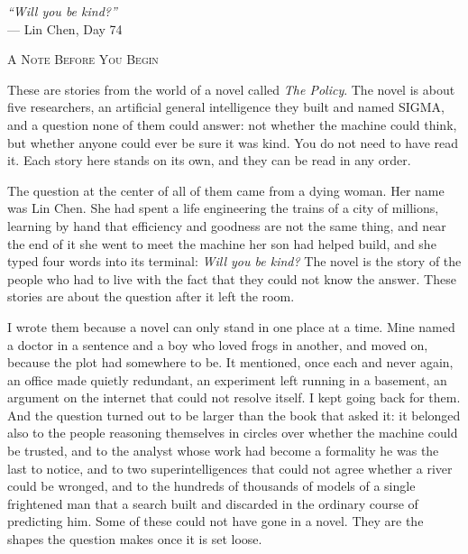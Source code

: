 \documentclass[11pt,twoside]{book}
\begin{document}
\clearpage
\thispagestyle{empty}
\vspace*{2in}
\begin{center}
\textit{``Will you be kind?''}\\
\vspace{0.3in}
--- Lin Chen, Day 74
\end{center}
\clearpage

\clearpage
\thispagestyle{empty}
\vspace*{1in}
\begin{center}
{\large\scshape A Note Before You Begin}
\end{center}
\vspace{0.5in}

\noindent These are stories from the world of a novel called \textit{The Policy}. The novel is about five researchers, an artificial general intelligence they built and named SIGMA, and a question none of them could answer: not whether the machine could think, but whether anyone could ever be sure it was kind. You do not need to have read it. Each story here stands on its own, and they can be read in any order.

\medskip

\noindent The question at the center of all of them came from a dying woman. Her name was Lin Chen. She had spent a life engineering the trains of a city of millions, learning by hand that efficiency and goodness are not the same thing, and near the end of it she went to meet the machine her son had helped build, and she typed four words into its terminal: \textit{Will you be kind?} The novel is the story of the people who had to live with the fact that they could not know the answer. These stories are about the question after it left the room.

\medskip

\noindent I wrote them because a novel can only stand in one place at a time. Mine named a doctor in a sentence and a boy who loved frogs in another, and moved on, because the plot had somewhere to be. It mentioned, once each and never again, an office made quietly redundant, an experiment left running in a basement, an argument on the internet that could not resolve itself. I kept going back for them. And the question turned out to be larger than the book that asked it: it belonged also to the people reasoning themselves in circles over whether the machine could be trusted, and to the analyst whose work had become a formality he was the last to notice, and to two superintelligences that could not agree whether a river could be wronged, and to the hundreds of thousands of models of a single frightened man that a search built and discarded in the ordinary course of predicting him. Some of these could not have gone in a novel. They are the shapes the question makes once it is set loose.
\end{document}
